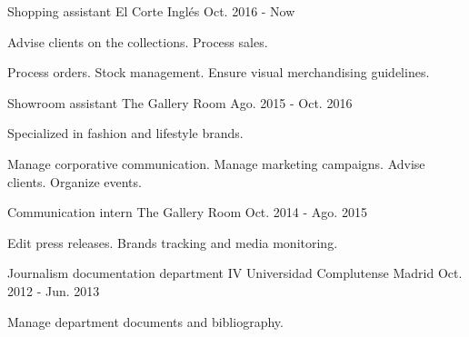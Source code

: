

\begin{cventries}

  \cventry
    {Shopping assistant} %
    {El Corte Inglés} %
    {} %
    {Oct. 2016 - Now} %
    {
      \begin{cvitems} %
        \item {Advise clients on the collections. Process sales.}
        \item {Process orders. Stock management. Ensure visual merchandising guidelines.}
      \end{cvitems}
    }

  \cventry
    {Showroom assistant} %
    {The Gallery Room} %
    {} %
    {Ago. 2015 - Oct. 2016} %
    {
      \begin{cvitems} %
        \item {Specialized in fashion and lifestyle brands.}
        \item {Manage corporative communication. Manage marketing campaigns. Advise clients. Organize events.}
      \end{cvitems}
    }

  \cventry
    {Communication intern} %
    {The Gallery Room} %
    {} %
    {Oct. 2014 - Ago. 2015} %
    {
      \begin{cvitems} %
        \item {Edit press releases. Brands tracking and media monitoring.}
      \end{cvitems}
    }

  \cventry
    {Journalism documentation department IV} %
    {Universidad Complutense Madrid} %
    {} %
    {Oct. 2012 - Jun. 2013} %
    {
      \begin{cvitems} %
        \item {Manage department documents and bibliography.}
      \end{cvitems}
    }


\end{cventries}
